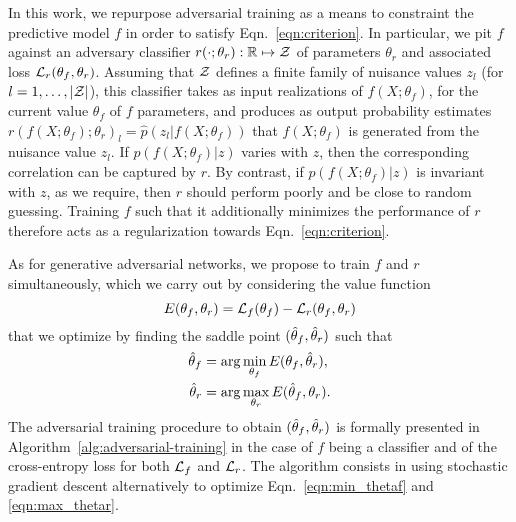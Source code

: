 \documentclass{article}
\theoremstyle{plain}
\begin{document}
In this work, we repurpose adversarial training as a means to constraint the
predictive model $f$ in order to satisfy Eqn.~\ref{eqn:criterion}. In
particular, we pit $f$ against an adversary classifier $r(\cdot ;
\theta_r) : \mathbb{R} \mapsto {\cal Z}$ of parameters $\theta_r$ and
associated loss ${\cal L}_r(\theta_f, \theta_r)$.
Assuming that ${\cal Z}$ defines a finite family of nuisance values $z_l$ (for $l=1, \dots, |{\cal Z}|$),
this classifier takes as input realizations of $f(X; \theta_f)$, for the current value $\theta_f$ of $f$ parameters,
and produces as output probability estimates $r(f(X; \theta_f); \theta_r)_l = \hat{p}(z_l| f(X; \theta_f)) $
that $f(X; \theta_f)$ is generated from the nuisance value $z_l$. If $p(f(X; \theta_f)|z)$ varies with $z$,
then the corresponding correlation can be captured by $r$. By contrast, if
$p(f(X; \theta_f)|z)$ is invariant with $z$, as we require, then $r$
should perform poorly and be close to random guessing. Training $f$ such that it additionally minimizes the performance of $r$
therefore acts as a regularization towards Eqn.~\ref{eqn:criterion}. 

As for generative adversarial networks, we propose to
train $f$ and $r$ simultaneously, which we carry out by considering
the value function
\begin{equation}
    E(\theta_f, \theta_r) = {\cal L}_f(\theta_f) - {\cal L}_r(\theta_f, \theta_r)
\end{equation}
that we optimize by finding the saddle point $(\smash{\hat\theta_f}, \smash{\hat\theta_r})$ such that
\begin{align}
    \smash{\hat\theta_f} &= \arg \min_{\theta_f} E(\theta_f, \smash{\hat\theta_r}), \label{eqn:min_thetaf} \\
    \smash{\hat\theta_r} &= \arg \max_{\theta_r} E(\smash{\hat\theta_f}, \theta_r) \label{eqn:max_thetar}.
\end{align}
The adversarial training procedure to obtain $(\smash{\hat\theta_f},
\smash{\hat\theta_r})$ is formally presented in
Algorithm~\ref{alg:adversarial-training} in the case of $f$ being a classifier
and of the cross-entropy loss for both ${\cal L}_f$ and ${\cal L}_r$. The algorithm
consists in using stochastic gradient descent alternatively to optimize
Eqn.~\ref{eqn:min_thetaf} and \ref{eqn:max_thetar}.
\end{document}
